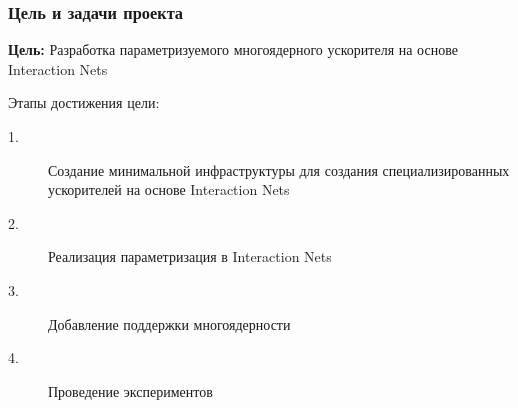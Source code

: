 \documentclass[aspectratio=169]{beamer}
\begin{document}
\begin{frame}
    \frametitle{Цель и задачи проекта}

    \textbf{Цель:} Разработка параметризуемого многоядерного ускорителя на основе Interaction Nets

    \vspace{2em}

    Этапы достижения цели:
    \begin{description}
        \item[\faArrowRight{} 1.] Создание минимальной инфраструктуры для создания специализированных ускорителей на основе Interaction Nets
        \item[2.] Реализация параметризация в Interaction Nets
        \item[3.] Добавление поддержки многоядерности
        \item[4.] Проведение экспериментов
    \end{description}


\end{frame}
\end{document}
